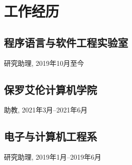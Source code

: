 \documentclass{article}
\newcommand{\cvsubsection}[1]{\subsection*{\hspace{1.45em}#1}}
\begin{document}















\section*{工作经历}

\cvsubsection{程序语言与软件工程实验室}
\vspace{-5pt}
研究助理, 2019年10月至今

\cvsubsection{保罗艾伦计算机学院}
\vspace{-5pt}
助教, 2021年3月--2021年6月

\cvsubsection{电子与计算机工程系}
\vspace{-5pt}
研究助理, 2019年1月--2019年6月
\end{document}
